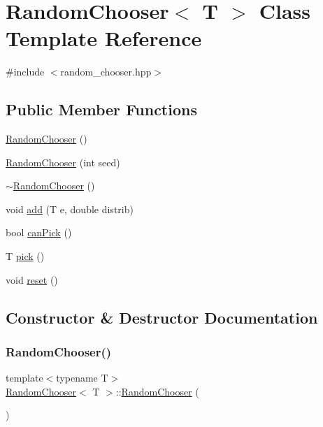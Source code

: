 \hypertarget{class_random_chooser}{}\section{Random\+Chooser$<$ T $>$ Class Template Reference}
\label{class_random_chooser}


{\ttfamily \#include $<$random\+\_\+chooser.\+hpp$>$}

\subsection*{Public Member Functions}
\begin{DoxyCompactItemize}
\item 
\hyperlink{class_random_chooser_a37e578a7c57930b652af969a6162bc98}{Random\+Chooser} ()
\item 
\hyperlink{class_random_chooser_ad00497640186ada99d3c3a93a3b6e3c6}{Random\+Chooser} (int seed)
\item 
\hyperlink{class_random_chooser_a50ed6ba072b601166e6f28008316c5a7}{$\sim$\+Random\+Chooser} ()
\item 
void \hyperlink{class_random_chooser_a144e0b8285d6873f1549986348cd81a6}{add} (T e, double distrib)
\item 
bool \hyperlink{class_random_chooser_ad114fa6014abba35401d6babbdf4da14}{can\+Pick} ()
\item 
T \hyperlink{class_random_chooser_a5fd96c600eaa7d4d92078e2917a03d08}{pick} ()
\item 
void \hyperlink{class_random_chooser_a914f845de1e4a4b9785cccf1409485d7}{reset} ()
\end{DoxyCompactItemize}


\subsection{Constructor \& Destructor Documentation}
\mbox{\label{class_random_chooser_a37e578a7c57930b652af969a6162bc98}} 
\subsubsection{\texorpdfstring{Random\+Chooser()}{RandomChooser()}\hspace{0.1cm}{\footnotesize\ttfamily [1/2]}}
{\footnotesize\ttfamily template$<$typename T$>$ \\
\hyperlink{class_random_chooser}{Random\+Chooser}$<$ T $>$\+::\hyperlink{class_random_chooser}{Random\+Chooser} (\begin{DoxyParamCaption}{ }\end{DoxyParamCaption})\hspace{0.3cm}{\ttfamily [inline]}}

